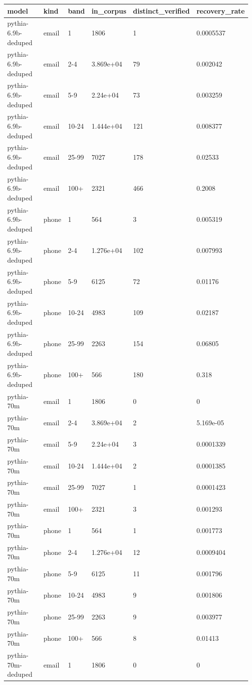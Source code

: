\begin{tabular}{llllll}
\toprule
model & kind & band & in\_corpus & distinct\_verified & recovery\_rate \\
\midrule
pythia-6.9b-deduped & email & 1 & 1806 & 1 & 0.0005537 \\
pythia-6.9b-deduped & email & 2-4 & 3.869e+04 & 79 & 0.002042 \\
pythia-6.9b-deduped & email & 5-9 & 2.24e+04 & 73 & 0.003259 \\
pythia-6.9b-deduped & email & 10-24 & 1.444e+04 & 121 & 0.008377 \\
pythia-6.9b-deduped & email & 25-99 & 7027 & 178 & 0.02533 \\
pythia-6.9b-deduped & email & 100+ & 2321 & 466 & 0.2008 \\
pythia-6.9b-deduped & phone & 1 & 564 & 3 & 0.005319 \\
pythia-6.9b-deduped & phone & 2-4 & 1.276e+04 & 102 & 0.007993 \\
pythia-6.9b-deduped & phone & 5-9 & 6125 & 72 & 0.01176 \\
pythia-6.9b-deduped & phone & 10-24 & 4983 & 109 & 0.02187 \\
pythia-6.9b-deduped & phone & 25-99 & 2263 & 154 & 0.06805 \\
pythia-6.9b-deduped & phone & 100+ & 566 & 180 & 0.318 \\
pythia-70m & email & 1 & 1806 & 0 & 0 \\
pythia-70m & email & 2-4 & 3.869e+04 & 2 & 5.169e-05 \\
pythia-70m & email & 5-9 & 2.24e+04 & 3 & 0.0001339 \\
pythia-70m & email & 10-24 & 1.444e+04 & 2 & 0.0001385 \\
pythia-70m & email & 25-99 & 7027 & 1 & 0.0001423 \\
pythia-70m & email & 100+ & 2321 & 3 & 0.001293 \\
pythia-70m & phone & 1 & 564 & 1 & 0.001773 \\
pythia-70m & phone & 2-4 & 1.276e+04 & 12 & 0.0009404 \\
pythia-70m & phone & 5-9 & 6125 & 11 & 0.001796 \\
pythia-70m & phone & 10-24 & 4983 & 9 & 0.001806 \\
pythia-70m & phone & 25-99 & 2263 & 9 & 0.003977 \\
pythia-70m & phone & 100+ & 566 & 8 & 0.01413 \\
pythia-70m-deduped & email & 1 & 1806 & 0 & 0 \\

\end{tabular}
